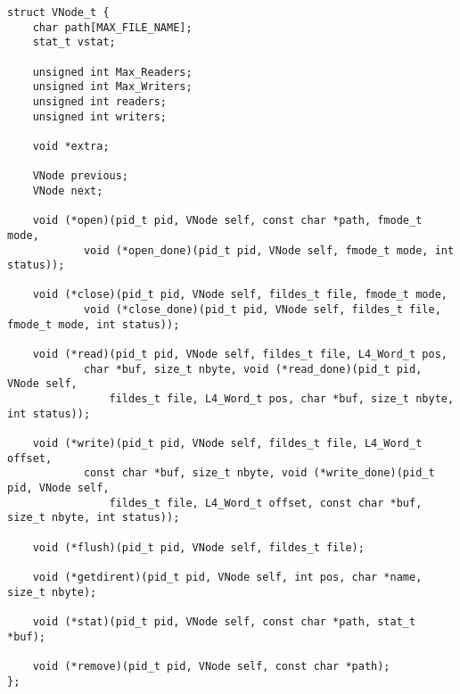 \documentclass[12pt,english]{article}
\begin{document}
\begin{itemize}
\begin{verbatim}
struct VNode_t {
	char path[MAX_FILE_NAME];
	stat_t vstat;

	unsigned int Max_Readers;
	unsigned int Max_Writers;
	unsigned int readers;
	unsigned int writers;
	
	void *extra; 

	VNode previous;
	VNode next;

	void (*open)(pid_t pid, VNode self, const char *path, fmode_t mode,
			void (*open_done)(pid_t pid, VNode self, fmode_t mode, int status));

	void (*close)(pid_t pid, VNode self, fildes_t file, fmode_t mode,
			void (*close_done)(pid_t pid, VNode self, fildes_t file, fmode_t mode, int status));

	void (*read)(pid_t pid, VNode self, fildes_t file, L4_Word_t pos,
			char *buf, size_t nbyte, void (*read_done)(pid_t pid, VNode self,
				fildes_t file, L4_Word_t pos, char *buf, size_t nbyte, int status));

	void (*write)(pid_t pid, VNode self, fildes_t file, L4_Word_t offset,
			const char *buf, size_t nbyte, void (*write_done)(pid_t pid, VNode self,
				fildes_t file, L4_Word_t offset, const char *buf, size_t nbyte, int status));

	void (*flush)(pid_t pid, VNode self, fildes_t file);

	void (*getdirent)(pid_t pid, VNode self, int pos, char *name, size_t nbyte);

	void (*stat)(pid_t pid, VNode self, const char *path, stat_t *buf);

	void (*remove)(pid_t pid, VNode self, const char *path);
};
\end{verbatim}


\end{itemize}
\end{document}

